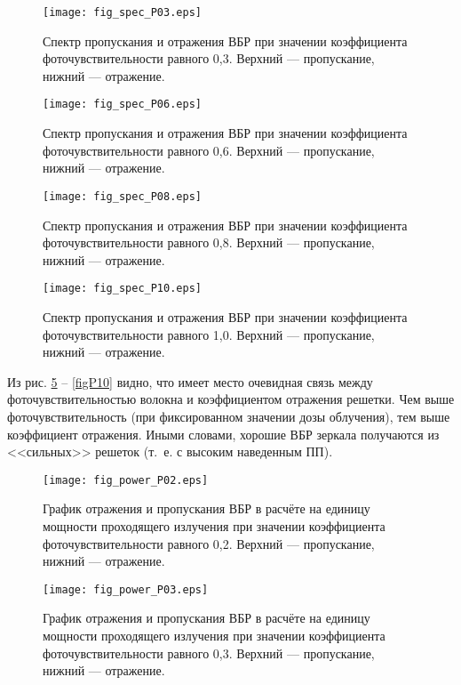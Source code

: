 \begin{figure}
  \centering
  \texttt{[image: fig\_spec\_P03.eps]}\\
  \caption{Спектр пропускания и отражения ВБР при значении коэффициента фоточувствительности равного 0,3. Верхний --- пропускание, нижний --- отражение.}\label{figP2}
\end{figure}

\begin{figure}
  \centering
  \texttt{[image: fig\_spec\_P06.eps]}\\
  \caption{Спектр пропускания и отражения ВБР при значении коэффициента фоточувствительности равного 0,6. Верхний --- пропускание, нижний --- отражение.}\label{figP3}
\end{figure}

\begin{figure}
  \centering
  \texttt{[image: fig\_spec\_P08.eps]}\\
  \caption{Спектр пропускания и отражения ВБР при значении коэффициента фоточувствительности равного 0,8. Верхний --- пропускание, нижний --- отражение.}\label{figP4}
\end{figure}

\begin{figure}
  \centering
  \texttt{[image: fig\_spec\_P10.eps]}\\
  \caption{Спектр пропускания и отражения ВБР при значении коэффициента фоточувствительности равного 1,0. Верхний --- пропускание, нижний --- отражение.}\label{figP5}
\end{figure}

Из рис. \ref{figP6} -- \ref{figP10} видно, что имеет место очевидная связь между фоточувствительностью волокна и коэффициентом отражения решетки. Чем выше фоточувствительность (при фиксированном значении дозы облучения), тем выше коэффициент отражения. Иными словами, хорошие ВБР зеркала получаются из <<сильных>> решеток (т.~е. с высоким наведенным ПП).

\begin{figure}
  \centering
  \texttt{[image: fig\_power\_P02.eps]}\\
  \caption{График отражения и пропускания ВБР в расчёте на единицу мощности проходящего излучения при значении коэффициента фоточувствительности равного 0,2. Верхний --- пропускание, нижний --- отражение.}\label{figP6}
\end{figure}

\begin{figure}
  \centering
  \texttt{[image: fig\_power\_P03.eps]}\\
  \caption{График отражения и пропускания ВБР в расчёте на единицу мощности проходящего излучения при значении коэффициента фоточувствительности равного 0,3. Верхний --- пропускание, нижний --- отражение.}\label{figP7}
\end{figure}


